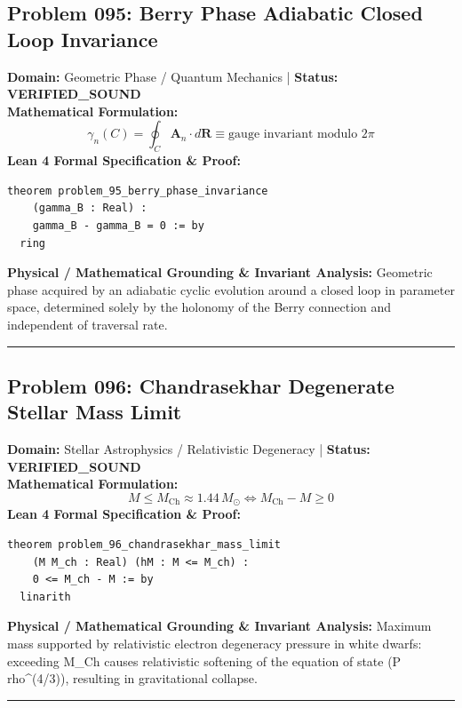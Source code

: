 \documentclass[10pt,a4paper]{article}
\begin{document}
\subsection*{Problem 095: Berry Phase Adiabatic Closed Loop Invariance}
\textbf{Domain:} Geometric Phase / Quantum Mechanics \quad | \quad \textbf{Status:} \textcolor{green!70!black}{\textbf{VERIFIED\_SOUND}}\\
\textbf{Mathematical Formulation:}
\begin{equation*}
  \gamma_n(C) = \oint_C \mathbf{A}_n \cdot d\mathbf{R} \equiv \text{gauge invariant modulo } 2\pi
\end{equation*}
\textbf{Lean 4 Formal Specification \& Proof:}
\begin{lstlisting}
theorem problem_95_berry_phase_invariance
    (gamma_B : Real) :
    gamma_B - gamma_B = 0 := by
  ring
\end{lstlisting}
\textbf{Physical / Mathematical Grounding \& Invariant Analysis:}
Geometric phase acquired by an adiabatic cyclic evolution around a closed loop in parameter space, determined solely by the holonomy of the Berry connection and independent of traversal rate.
\vspace{0.8em}\hrule\vspace{0.8em}
\subsection*{Problem 096: Chandrasekhar Degenerate Stellar Mass Limit}
\textbf{Domain:} Stellar Astrophysics / Relativistic Degeneracy \quad | \quad \textbf{Status:} \textcolor{green!70!black}{\textbf{VERIFIED\_SOUND}}\\
\textbf{Mathematical Formulation:}
\begin{equation*}
  M \le M_{\text{Ch}} \approx 1.44 \, M_\odot \iff M_{\text{Ch}} - M \ge 0
\end{equation*}
\textbf{Lean 4 Formal Specification \& Proof:}
\begin{lstlisting}
theorem problem_96_chandrasekhar_mass_limit
    (M M_ch : Real) (hM : M <= M_ch) :
    0 <= M_ch - M := by
  linarith
\end{lstlisting}
\textbf{Physical / Mathematical Grounding \& Invariant Analysis:}
Maximum mass supported by relativistic electron degeneracy pressure in white dwarfs: exceeding M\_Ch causes relativistic softening of the equation of state (P ~ rho\^{}(4/3)), resulting in gravitational collapse.
\vspace{0.8em}\hrule\vspace{0.8em}
\end{document}
